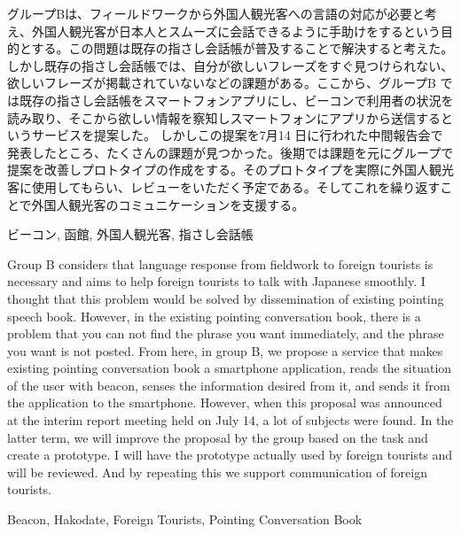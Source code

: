 \documentclass[11pt,papersize]{jsbook}
\begin{document}
%
\maketitle

\frontmatter

\begin{jabstract}



 グループBは、フィールドワークから外国人観光客への言語の対応が必要と考え、外国人観光客が日本人とスムーズに会話できるように手助けをするという目的とする。この問題は既存の指さし会話帳が普及することで解決すると考えた。しかし既存の指さし会話帳では、自分が欲しいフレーズをすぐ見つけられない、欲しいフレーズが掲載されていないなどの課題がある。ここから、グループB では既存の指さし会話帳をスマートフォンアプリにし、ビーコンで利用者の状況を読み取り、そこから欲しい情報を察知しスマートフォンにアプリから送信するというサービスを提案した。
  しかしこの提案を7月14 日に行われた中間報告会で発表したところ、たくさんの課題が見つかった。後期では課題を元にグループで提案を改善しプロトタイプの作成をする。そのプロトタイプを実際に外国人観光客に使用してもらい、レビューをいただく予定である。そしてこれを繰り返すことで外国人観光客のコミュニケーションを支援する。

\begin{jkeyword}
  ビーコン, 函館, 外国人観光客, 指さし会話帳
\end{jkeyword}

\end{jabstract}

\begin{eabstract}



 Group B considers that language response from fieldwork to foreign tourists is necessary and aims to help foreign tourists to talk with Japanese smoothly. I thought that this problem would be solved by dissemination of existing pointing speech book. However, in the existing pointing conversation book, there is a problem that you can not find the phrase you want immediately, and the phrase you want is not posted. From here, in group B, we propose a service that makes existing pointing conversation book a smartphone application, reads the situation of the user with beacon, senses the information desired from it, and sends it from the application to the smartphone. However, when this proposal was announced at the interim report meeting held on July 14, a lot of subjects were found. In the latter term, we will improve the proposal by the group based on the task and create a prototype. I will have the prototype actually used by foreign tourists and will be reviewed. And by repeating this we support communication of foreign tourists.

\begin{ekeyword}
  Beacon, Hakodate, Foreign Tourists, Pointing Conversation Book
\end{ekeyword}

\end{eabstract}
\end{document}
